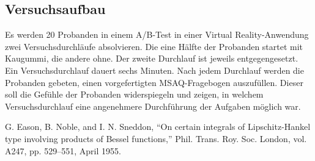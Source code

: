 \documentclass[conference]{IEEEtran}
\begin{document}
\subsection{Versuchsaufbau}
Es werden 20 Probanden in einem A/B-Test in einer Virtual Reality-Anwendung zwei Versuchsdurchläufe absolvieren. Die eine Hälfte der Probanden startet mit Kaugummi, die andere ohne. Der zweite Durchlauf ist jeweils entgegengesetzt. Ein Versuchsdurchlauf dauert sechs Minuten. Nach jedem Durchlauf werden die Probanden gebeten, einen vorgefertigten MSAQ-Fragebogen auszufüllen. Dieser soll die Gefühle der Probanden widerspiegeln und zeigen, in welchem Versuchsdurchlauf eine angenehmere Durchführung der Aufgaben möglich war. 




\begin{thebibliography}{00}
 G. Eason, B. Noble, and I. N. Sneddon, ``On certain integrals of Lipschitz-Hankel type involving products of Bessel functions,'' Phil. Trans. Roy. Soc. London, vol. A247, pp. 529--551, April 1955.

\end{thebibliography}
\end{document}
